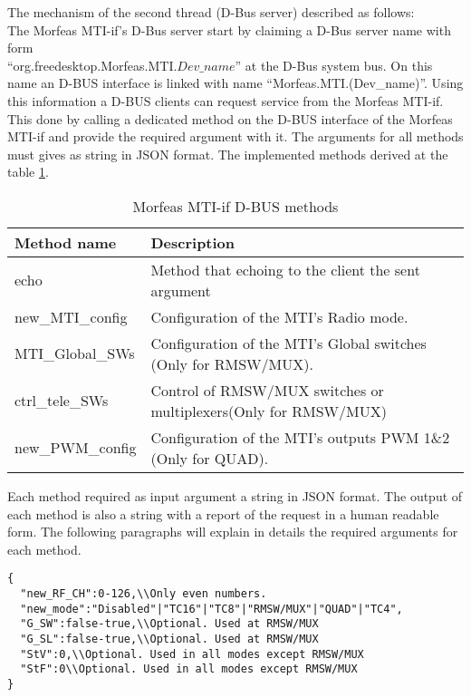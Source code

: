 The mechanism of the second thread (D-Bus server) described as follows:\\
The Morfeas MTI-if's D-Bus server start by claiming a D-Bus server name with form \\``org.freedesktop.Morfeas.MTI.\(Dev\_name\)'' at the D-Bus system bus.
On this name an D-BUS interface is linked with name ``Morfeas.MTI.(Dev\_name)''.
Using this information a D-BUS clients can request service from the Morfeas MTI-if.
This done by calling a dedicated method on the D-BUS interface of the Morfeas MTI-if and provide the required argument with it.
The arguments for all methods must gives as string in JSON format.
The implemented methods derived at the table \ref{tab:MTI-if_D-BUS_methods}.
\begin{table}[h!]
  \begin{center}
    \begin{tabular}{|l|l|}
      \hline
	  \textbf{Method name} & \textbf{Description}\\
      \hline
	  echo & Method that echoing to the client the sent argument\\
      new\_MTI\_config & Configuration of the MTI's Radio mode.\\
      MTI\_Global\_SWs & Configuration of the MTI's Global switches (Only for RMSW/MUX).\\
	  ctrl\_tele\_SWs & Control of RMSW/MUX switches or multiplexers(Only for RMSW/MUX)\\
      new\_PWM\_config & Configuration of the MTI's outputs PWM 1\&2 (Only for QUAD).\\
	  \hline
    \end{tabular}
	\caption{Morfeas MTI-if D-BUS methods}
	\label{tab:MTI-if_D-BUS_methods}
  \end{center}
\end{table}

Each method required as input argument a string in JSON format. The output of each method is also a string with a report of the request in a human readable form.
The following paragraphs will explain in details the required arguments for each method.

\begin{lstlisting}[frame=single,caption=Argument for new\_MTI\_config()]
{
  "new_RF_CH":0-126,\\Only even numbers.
  "new_mode":"Disabled"|"TC16"|"TC8"|"RMSW/MUX"|"QUAD"|"TC4",
  "G_SW":false-true,\\Optional. Used at RMSW/MUX
  "G_SL":false-true,\\Optional. Used at RMSW/MUX
  "StV":0,\\Optional. Used in all modes except RMSW/MUX
  "StF":0\\Optional. Used in all modes except RMSW/MUX
}
\end{lstlisting}

